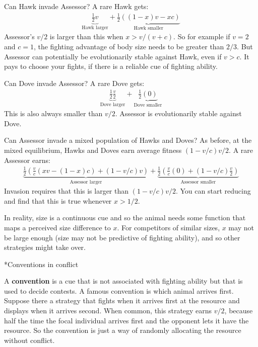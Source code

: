 \documentclass[10pt,reqno]{amsbook}
\makeatletter
\newcommand{\bemph}[1]{{\textbf{\textcolor{bemphcol}{#1}}}}
\renewcommand\section{\@startsection{section}{1}
\z@{.7\linespacing\@plus\linespacing}{.5\linespacing}
{\large\bfseries\itshape}}
\numberwithin{equation}{chapter}
\makeatother
\begin{document}
Can Hawk invade Assessor? A rare Hawk gets:
\begin{align*}
	\underbrace{\frac{1}{2} v }_{\text{Hawk larger}} + \underbrace{\frac{1}{2} ((1-x)v-xc) }_{\text{Hawk smaller}}
\end{align*}
Assessor's $v/2$ is larger than this when $x > v/(v+c)$. So for example if $v=2$ and $c=1$, the fighting advantage of body size needs to be greater than $2/3$. But Assessor can potentially be evolutionarily stable against Hawk, even if $v>c$. It pays to choose your fights, if there is a reliable cue of fighting ability.

Can Dove invade Assessor? A rare Dove gets:
\begin{align*}
	\underbrace{\frac{1}{2} \frac{v}{2}}_{\text{Dove larger}} + \underbrace{\frac{1}{2} (0) }_{\text{Dove smaller}}
\end{align*}
This is also always smaller than $v/2$. Assessor is evolutionarily stable against Dove.

Can Assessor invade a mixed population of Hawks and Doves? As before, at the mixed equilibrium, Hawks and Doves earn average fitness $(1-v/c)v/2$. A rare Assessor earns:
\begin{align*}
	\underbrace{\frac{1}{2} \left( \frac{v}{c} (xv-(1-x)c) + (1-v/c)v \right)}_{\text{Assessor larger}} + \underbrace{\frac{1}{2} \left( \frac{v}{c}(0) + (1-v/c)\frac{v}{2} \right) }_{\text{Assessor smaller}}
\end{align*}
Invasion requires that this is larger than $(1-v/c)v/2$. You can start reducing and find that this is true whenever $x>1/2$. 

In reality, size is a continuous cue and so the animal needs some function that maps a perceived size difference to $x$. For competitors of similar sizes, $x$ may not be large enough (size may not be predictive of fighting ability), and so other strategies might take over.

\section*{Conventions in conflict}

A \bemph{convention} is a cue that is not associated with fighting ability but that is used to decide contests. A famous convention is which animal arrives first. Suppose there a strategy that fights when it arrives first at the resource and displays when it arrives second. When common, this strategy earns $v/2$, because half the time the focal individual arrives first and the opponent lets it have the resource. So the convention is just a way of randomly allocating the resource without conflict.
\end{document}
